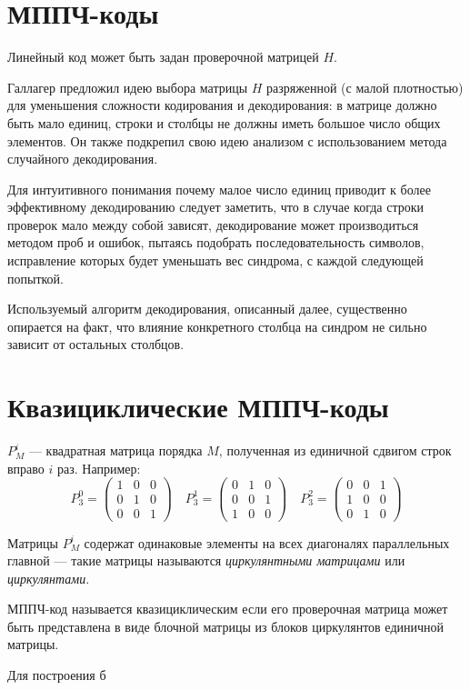\section{МППЧ-коды}

Линейный код может быть задан проверочной матрицей $H$.

Галлагер \cite{gallager} предложил идею выбора матрицы $H$ разряженной (с малой плотностью) для уменьшения
 сложности кодирования и декодирования: в матрице должно быть мало единиц, строки и столбцы не должны 
 иметь большое число  общих элементов. Он также подкрепил свою идею анализом с использованием 
 метода случайного декодирования.
 
 Для интуитивного понимания почему малое число единиц приводит к более эффективному декодированию следует
 заметить, что в случае когда строки проверок мало между собой зависят, декодирование может производиться 
 методом проб и ошибок, пытаясь подобрать последовательность символов, исправление которых будет уменьшать
 вес синдрома, с каждой следующей попыткой.
 
 Используемый алгоритм декодирования, описанный далее, существенно опирается на факт, что влияние конкретного
 столбца на синдром не сильно зависит от остальных столбцов.
 



\section{Квазициклические МППЧ-коды}

$P^i_M$ --- квадратная матрица порядка $M$, полученная из единичной сдвигом строк вправо $i$ раз. Например:
\[
P^0_3=
\begin{pmatrix}
	1 & 0 & 0 \\
	0 & 1 & 0 \\
	0 & 0 & 1
\end{pmatrix}
\quad
P^1_3=
\begin{pmatrix}
	0 & 1 & 0 \\
	0 & 0 & 1 \\
	1 & 0 & 0
\end{pmatrix}
\quad
P^2_3=
\begin{pmatrix}
	0 & 0 & 1 \\
	1 & 0 & 0 \\
	0 & 1 & 0
\end{pmatrix}
\] 

Матрицы $P^i_M$ содержат одинаковые элементы на всех диагоналях параллельных главной --- такие матрицы
называются \textit{циркулянтными матрицами} или \textit{циркулянтами}.

МППЧ-код называется квазициклическим если его проверочная матрица может быть представлена в виде блочной
матрицы из блоков циркулянтов единичной матрицы.

Для построения б
